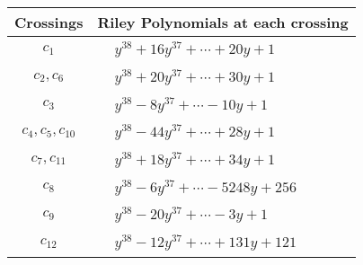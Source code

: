 \documentclass[1p]{elsarticle_modified}
\theoremstyle{definition}
\begin{document}
\begin{tabular}{m{50pt}|m{274pt}}
Crossings & \hspace{64pt}Riley Polynomials at each crossing \\
\hline $$\begin{aligned}c_{1}\end{aligned}$$&$\begin{aligned}
&y^{38}+16 y^{37}+\cdots+20 y+1
\end{aligned}$\\
\hline $$\begin{aligned}c_{2},c_{6}\end{aligned}$$&$\begin{aligned}
&y^{38}+20 y^{37}+\cdots+30 y+1
\end{aligned}$\\
\hline $$\begin{aligned}c_{3}\end{aligned}$$&$\begin{aligned}
&y^{38}-8 y^{37}+\cdots-10 y+1
\end{aligned}$\\
\hline $$\begin{aligned}c_{4},c_{5},c_{10}\end{aligned}$$&$\begin{aligned}
&y^{38}-44 y^{37}+\cdots+28 y+1
\end{aligned}$\\
\hline $$\begin{aligned}c_{7},c_{11}\end{aligned}$$&$\begin{aligned}
&y^{38}+18 y^{37}+\cdots+34 y+1
\end{aligned}$\\
\hline $$\begin{aligned}c_{8}\end{aligned}$$&$\begin{aligned}
&y^{38}-6 y^{37}+\cdots-5248 y+256
\end{aligned}$\\
\hline $$\begin{aligned}c_{9}\end{aligned}$$&$\begin{aligned}
&y^{38}-20 y^{37}+\cdots-3 y+1
\end{aligned}$\\
\hline $$\begin{aligned}c_{12}\end{aligned}$$&$\begin{aligned}
&y^{38}-12 y^{37}+\cdots+131 y+121
\end{aligned}$\\
\hline
\end{tabular}\\~\\
\end{document}

